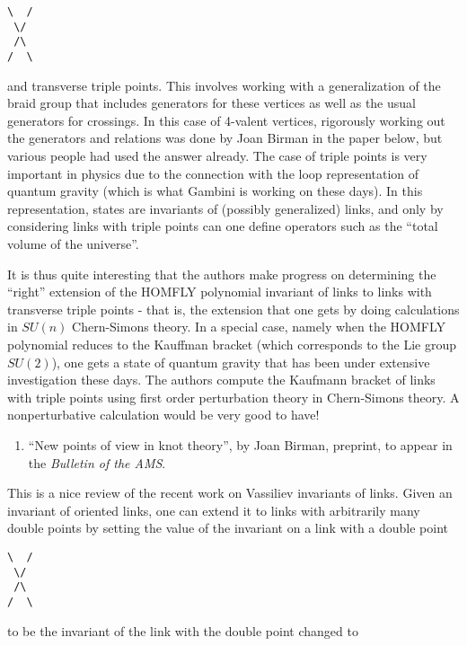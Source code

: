\documentclass{article}
\def\tightlist{}
\begin{document}
\begin{verbatim}
\  /
 \/
 /\
/  \
\end{verbatim}

and transverse triple points. This involves working with a
generalization of the braid group that includes generators for these
vertices as well as the usual generators for crossings. In this case of
4-valent vertices, rigorously working out the generators and relations
was done by Joan Birman in the paper below, but various people had used
the answer already. The case of triple points is very important in
physics due to the connection with the loop representation of quantum
gravity (which is what Gambini is working on these days). In this
representation, states are invariants of (possibly generalized) links,
and only by considering links with triple points can one define
operators such as the ``total volume of the universe''.

It is thus quite interesting that the authors make progress on
determining the ``right'' extension of the HOMFLY polynomial invariant
of links to links with transverse triple points - that is, the extension
that one gets by doing calculations in \(SU(n)\) Chern-Simons theory. In
a special case, namely when the HOMFLY polynomial reduces to the
Kauffman bracket (which corresponds to the Lie group \(SU(2)\)), one
gets a state of quantum gravity that has been under extensive
investigation these days. The authors compute the Kaufmann bracket of
links with triple points using first order perturbation theory in
Chern-Simons theory. A nonperturbative calculation would be very good to
have!

\begin{enumerate}
\def\labelenumi{\arabic{enumi})}
\setcounter{enumi}{1}
\tightlist
\item
  ``New points of view in knot theory'', by Joan Birman, preprint, to
  appear in the \emph{Bulletin of the AMS}.
\end{enumerate}

This is a nice review of the recent work on Vassiliev invariants of
links. Given an invariant of oriented links, one can extend it to links
with arbitrarily many double points by setting the value of the
invariant on a link with a double point

\begin{verbatim}
\  /
 \/
 /\
/  \
\end{verbatim}

to be the invariant of the link with the double point changed to
\end{document}

